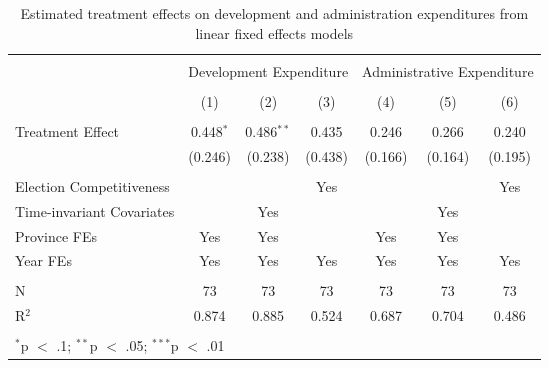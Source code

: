 
\begin{table}[!htbp] \centering 
  \caption{Estimated treatment effects on development and administration expenditures from linear fixed effects models} 
  \label{tab:lfe_mech} 
\begin{tabular}{@{\extracolsep{5pt}}lcccccc} 
\\[-1.8ex]\hline 
\hline \\[-1.8ex] 
 & \multicolumn{3}{c}{Development Expenditure} & \multicolumn{3}{c}{Administrative Expenditure} \\ 
\\[-1.8ex] & (1) & (2) & (3) & (4) & (5) & (6)\\ 
\hline \\[-1.8ex] 
 Treatment Effect & 0.448$^{*}$ & 0.486$^{**}$ & 0.435 & 0.246 & 0.266 & 0.240 \\ 
  & (0.246) & (0.238) & (0.438) & (0.166) & (0.164) & (0.195) \\ 
 \hline \\[-1.8ex] 
Election Competitiveness &  &  & Yes &  &  & Yes \\ 
Time-invariant Covariates &  & Yes &  &  & Yes &  \\ 
Province FEs & Yes & Yes &  & Yes & Yes &  \\ 
Year FEs & Yes & Yes & Yes & Yes & Yes & Yes \\ 
\hline \\[-1.8ex] 
N & 73 & 73 & 73 & 73 & 73 & 73 \\ 
R$^{2}$ & 0.874 & 0.885 & 0.524 & 0.687 & 0.704 & 0.486 \\ 
\hline 
\hline \\[-1.8ex] 
\multicolumn{7}{l}{$^{*}$p $<$ .1; $^{**}$p $<$ .05; $^{***}$p $<$ .01} \\ 
\end{tabular} 
\end{table} 
